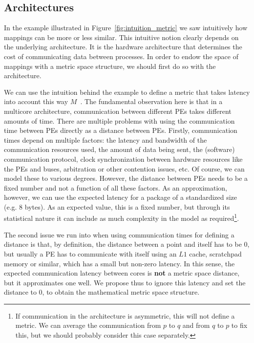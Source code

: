 \subsection{Architectures}

In the example illustrated in Figure~\ref{fig:intuition_metric} we saw intuitively how mappings can be more or less similar.
This intuitive notion clearly depends on the underlying architecture.
It is the hardware architecture that determines the cost of communicating data between processes.
In order to endow the space of mappings with a metric space structure, we should first do so with the architecture.

We can use the intuition behind the example to define a metric that takes latency into account this way $M$~\cite{goens_mcsoc18}.
The fundamental observation here is that in a multicore architecture, communication between different \acp{PE} takes different amounts of time.
There are multiple problems with using the communication time between \acp{PE} directly as a distance between \acp{PE}.
Firstly, communication times depend on multiple factors: the latency and bandwidth of the communication resources used, the amount of data being sent, the (software) communication protocol, clock synchronization between hardware resources like the \acp{PE} and buses, arbitration or other contention issues, etc.
Of course, we can model these to various degrees.
However, the distance between \acp{PE} needs to be a fixed number and not a function of all these factors.
As an approximation, however, we can use the expected latency for a package of a standardized size (e.g. $8$ bytes).
As an expected value, this is a fixed number, but through its statistical nature it can include as much complexity in the model as required\footnote{If communication in the architecture is asymmetric, this will not define a metric. We can average the communication from $p$ to $q$ and from $q$ to $p$ to fix this, but we should probably consider this case separately.}.

The second issue we run into when using communication times for defining a distance is that, by definition, the distance between a point and itself has to be $0$, but usually a PE has to communicate with itself using an $L1$ cache, scratchpad memory or similar, which has a small but non-zero latency. In this sense, the expected communication latency between cores is \textbf{not} a metric space distance, but it approximates one well. We propose thus to ignore this latency and set the distance to 0, to obtain the mathematical metric space structure. 

